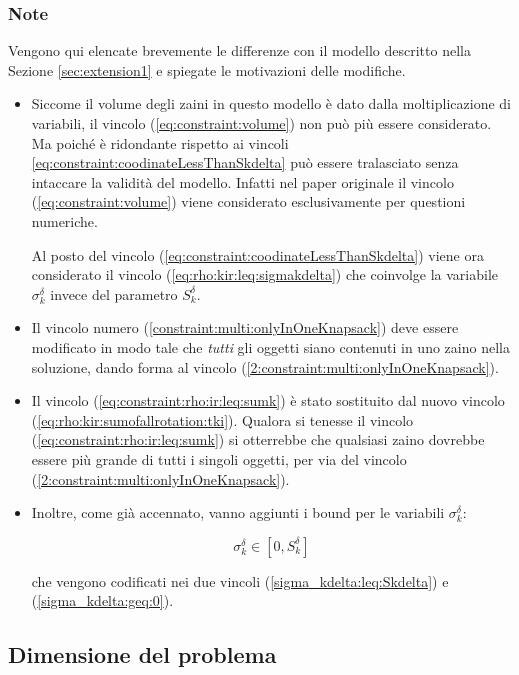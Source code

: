 \subsubsection{Note}
\label{sec:extension2:Note}
Vengono qui elencate brevemente le differenze con il modello descritto nella 
Sezione \ref{sec:extension1} e spiegate le motivazioni delle modifiche.
\begin{itemize}

\item Siccome il volume degli zaini in questo modello è dato dalla 
moltiplicazione di variabili, il vincolo
(\ref{eq:constraint:volume}) non può più essere considerato. 
Ma poiché è ridondante rispetto ai vincoli 
\ref{eq:constraint:coodinateLessThanSkdelta}
può essere tralasciato senza intaccare la validità del modello.
Infatti nel paper originale il vincolo (\ref{eq:constraint:volume}) viene 
considerato esclusivamente per questioni numeriche.

Al posto del vincolo (\ref{eq:constraint:coodinateLessThanSkdelta}) viene ora 
considerato il vincolo 
(\ref{eq:rho:kir:leq:sigmakdelta}) che coinvolge la variabile $\sigma_k^\delta$
invece del parametro $S_k^\delta$.

\item Il vincolo numero (\ref{constraint:multi:onlyInOneKnapsack}) deve essere 
modificato in modo tale che \emph{tutti} gli oggetti siano contenuti in uno 
zaino nella soluzione, dando forma al vincolo 
(\ref{2:constraint:multi:onlyInOneKnapsack}).

\item Il vincolo (\ref{eq:constraint:rho:ir:leq:sumk}) è stato sostituito dal
nuovo vincolo (\ref{eq:rho:kir:sumofallrotation:tki}). Qualora si tenesse il
vincolo (\ref{eq:constraint:rho:ir:leq:sumk}) si otterrebbe che qualsiasi zaino
 dovrebbe essere più grande di tutti i singoli oggetti, per via  del vincolo
 (\ref{2:constraint:multi:onlyInOneKnapsack}).

\item Inoltre, come già accennato, vanno aggiunti i bound per le variabili 
$\sigma_k^\delta$:

\begin{equation}
\sigma_k^\delta \in [ 0, S_k^\delta ]
\end{equation}

che vengono codificati nei due vincoli
(\ref{sigma_kdelta:leq:Skdelta}) e (\ref{sigma_kdelta:geq:0}).
\end{itemize}
\subsection{Dimensione del problema}

